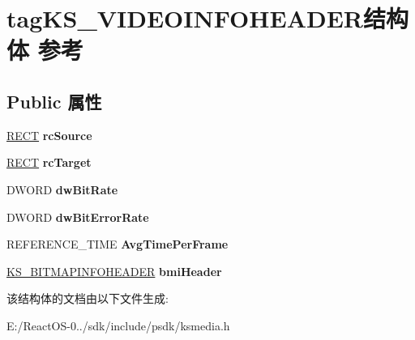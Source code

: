 \hypertarget{structtag_k_s___v_i_d_e_o_i_n_f_o_h_e_a_d_e_r}{}\section{tag\+K\+S\+\_\+\+V\+I\+D\+E\+O\+I\+N\+F\+O\+H\+E\+A\+D\+E\+R结构体 参考}
\label{structtag_k_s___v_i_d_e_o_i_n_f_o_h_e_a_d_e_r}
\subsection*{Public 属性}
\begin{DoxyCompactItemize}
\item 
\mbox{\label{structtag_k_s___v_i_d_e_o_i_n_f_o_h_e_a_d_e_r_a26e81c3d7e1672c344c7f1362e3cde50}} 
\hyperlink{structtag_r_e_c_t}{R\+E\+CT} {\bfseries rc\+Source}
\item 
\mbox{\label{structtag_k_s___v_i_d_e_o_i_n_f_o_h_e_a_d_e_r_a6b8f59c5c1feb9ac4963951800095fbc}} 
\hyperlink{structtag_r_e_c_t}{R\+E\+CT} {\bfseries rc\+Target}
\item 
\mbox{\label{structtag_k_s___v_i_d_e_o_i_n_f_o_h_e_a_d_e_r_a7ab397ba0ef60a0bb449e045d2acca8d}} 
D\+W\+O\+RD {\bfseries dw\+Bit\+Rate}
\item 
\mbox{\label{structtag_k_s___v_i_d_e_o_i_n_f_o_h_e_a_d_e_r_a61ee8d4ae605761206b2f35175e036ac}} 
D\+W\+O\+RD {\bfseries dw\+Bit\+Error\+Rate}
\item 
\mbox{\label{structtag_k_s___v_i_d_e_o_i_n_f_o_h_e_a_d_e_r_af2bd554ba27dad2c3b2ff72965a9d88c}} 
R\+E\+F\+E\+R\+E\+N\+C\+E\+\_\+\+T\+I\+ME {\bfseries Avg\+Time\+Per\+Frame}
\item 
\mbox{\label{structtag_k_s___v_i_d_e_o_i_n_f_o_h_e_a_d_e_r_aa82785ce41f3dc2ba18d0cfb168db101}} 
\hyperlink{structtag_k_s___b_i_t_m_a_p_i_n_f_o_h_e_a_d_e_r}{K\+S\+\_\+\+B\+I\+T\+M\+A\+P\+I\+N\+F\+O\+H\+E\+A\+D\+ER} {\bfseries bmi\+Header}
\end{DoxyCompactItemize}


该结构体的文档由以下文件生成\+:\begin{DoxyCompactItemize}
\item 
E\+:/\+React\+O\+S-\/0../sdk/include/psdk/ksmedia.\+h\end{DoxyCompactItemize}
